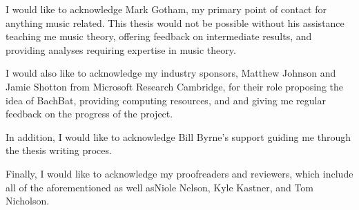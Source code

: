 
\begin{acknowledgements}

 I would like to acknowledge Mark Gotham, my primary point of contact for
 anything music related. This thesis would not be possible without his
 assistance teaching me music theory, offering feedback on intermediate results,
 and providing analyses requiring expertise in music theory.

 I would also like to acknowledge my industry sponsors, Matthew Johnson
 and Jamie Shotton from Microsoft Research Cambridge, for their role
 proposing the idea of BachBat, providing computing resources, and
 and giving me regular feedback on the progress of the project.

 In addition, I would like to acknowledge Bill Byrne's support guiding me through
 the thesis writing proces.

 Finally, I would like to acknowledge my proofreaders and reviewers, which
 include all of the aforementioned as well asNiole Nelson, Kyle
 Kastner, and Tom Nicholson.

\end{acknowledgements}
